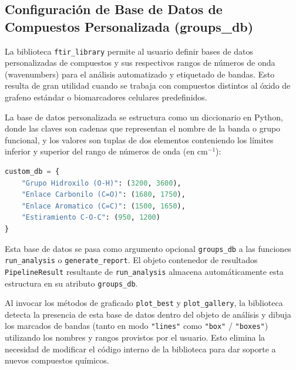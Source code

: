 \subsection{Configuración de Base de Datos de Compuestos Personalizada (groups\_db)}
La biblioteca \texttt{ftir\_library} permite al usuario definir bases de datos personalizadas de compuestos y sus respectivos rangos de números de onda (wavenumbers) para el análisis automatizado y etiquetado de bandas. Esto resulta de gran utilidad cuando se trabaja con compuestos distintos al óxido de grafeno estándar o biomarcadores celulares predefinidos.

La base de datos personalizada se estructura como un diccionario en Python, donde las claves son cadenas que representan el nombre de la banda o grupo funcional, y los valores son tuplas de dos elementos conteniendo los límites inferior y superior del rango de números de onda (en $\text{cm}^{-1}$):

\begin{lstlisting}[language=Python, caption=Definición de base de datos personalizada]
custom_db = {
    "Grupo Hidroxilo (O-H)": (3200, 3600),
    "Enlace Carbonilo (C=O)": (1680, 1750),
    "Enlace Aromatico (C=C)": (1500, 1650),
    "Estiramiento C-O-C": (950, 1200)
}
\end{lstlisting}

Esta base de datos se pasa como argumento opcional \texttt{groups\_db} a las funciones \texttt{run\_analysis} o \texttt{generate\_report}. El objeto contenedor de resultados \texttt{PipelineResult} resultante de \texttt{run\_analysis} almacena automáticamente esta estructura en su atributo \texttt{groups\_db}.

Al invocar los métodos de graficado \texttt{plot\_best} y \texttt{plot\_gallery}, la biblioteca detecta la presencia de esta base de datos dentro del objeto de análisis y dibuja los marcados de bandas (tanto en modo \texttt{"lines"} como \texttt{"box"} / \texttt{"boxes"}) utilizando los nombres y rangos provistos por el usuario. Esto elimina la necesidad de modificar el código interno de la biblioteca para dar soporte a nuevos compuestos químicos.
